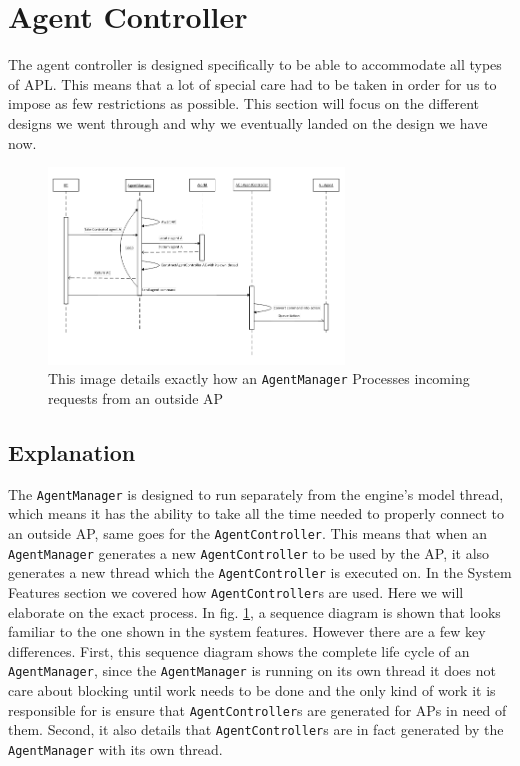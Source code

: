 
\section{Agent Controller}

The agent controller is designed specifically to be able to accommodate
all types of APL. This means that a lot of special care had to be
taken in order for us to impose as few restrictions as possible. This
section will focus on the different designs we went through and why
we eventually landed on the design we have now.

\begin{figure}
\begin{centering}
\includegraphics[width=0.7\textwidth]{ImplementationAgentControllerSequenceDiagram}
\par\end{centering}

\caption{This image details exactly how an \texttt{AgentManager} Processes
incoming requests from an outside AP \label{fig:ImplementationAgentControllerSequenceDiagram}}
\end{figure}



\subsection*{Explanation}

The \texttt{AgentManager} is designed to run separately from the engine\textquoteright{}s
model thread, which means it has the ability to take all the time
needed to properly connect to an outside AP, same goes for the \texttt{AgentController}.
This means that when an \texttt{AgentManager} generates a new \texttt{AgentController}
to be used by the AP, it also generates a new thread which the \texttt{AgentController}
is executed on. In the System Features section we covered how \texttt{AgentController}s
are used. Here we will elaborate on the exact process. In fig. \ref{fig:ImplementationAgentControllerSequenceDiagram},
a sequence diagram is shown that looks familiar to the one shown in
the system features. However there are a few key differences. First,
this sequence diagram shows the complete life cycle of an \texttt{AgentManager},
since the \texttt{AgentManager} is running on its own thread it does
not care about blocking until work needs to be done and the only kind
of work it is responsible for is ensure that \texttt{AgentController}s
are generated for APs in need of them. Second, it also details that
\texttt{AgentController}s are in fact generated by the \texttt{AgentManager}
with its own thread.


